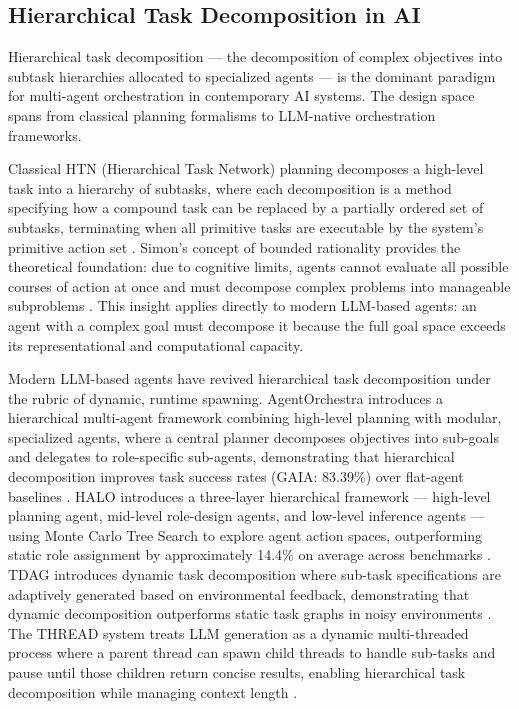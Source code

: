 \subsection{Hierarchical Task Decomposition in AI}

Hierarchical task decomposition --- the decomposition of complex objectives into subtask hierarchies allocated to specialized agents --- is the dominant paradigm for multi-agent orchestration in contemporary AI systems. The design space spans from classical planning formalisms to LLM-native orchestration frameworks.

Classical HTN (Hierarchical Task Network) planning decomposes a high-level task into a hierarchy of subtasks, where each decomposition is a method specifying how a compound task can be replaced by a partially ordered set of subtasks, terminating when all primitive tasks are executable by the system's primitive action set \cite{ghallab2004htn}. Simon's concept of bounded rationality provides the theoretical foundation: due to cognitive limits, agents cannot evaluate all possible courses of action at once and must decompose complex problems into manageable subproblems \cite{simon}. This insight applies directly to modern LLM-based agents: an agent with a complex goal must decompose it because the full goal space exceeds its representational and computational capacity.

Modern LLM-based agents have revived hierarchical task decomposition under the rubric of dynamic, runtime spawning. AgentOrchestra introduces a hierarchical multi-agent framework combining high-level planning with modular, specialized agents, where a central planner decomposes objectives into sub-goals and delegates to role-specific sub-agents, demonstrating that hierarchical decomposition improves task success rates (GAIA: 83.39\%) over flat-agent baselines \cite{arxiv-agentorchestra}. HALO introduces a three-layer hierarchical framework --- high-level planning agent, mid-level role-design agents, and low-level inference agents --- using Monte Carlo Tree Search to explore agent action spaces, outperforming static role assignment by approximately 14.4\% on average across benchmarks \cite{arxiv-halo}. TDAG introduces dynamic task decomposition where sub-task specifications are adaptively generated based on environmental feedback, demonstrating that dynamic decomposition outperforms static task graphs in noisy environments \cite{arxiv-tdag}. The THREAD system treats LLM generation as a dynamic multi-threaded process where a parent thread can spawn child threads to handle sub-tasks and pause until those children return concise results, enabling hierarchical task decomposition while managing context length \cite{thread2025}.


